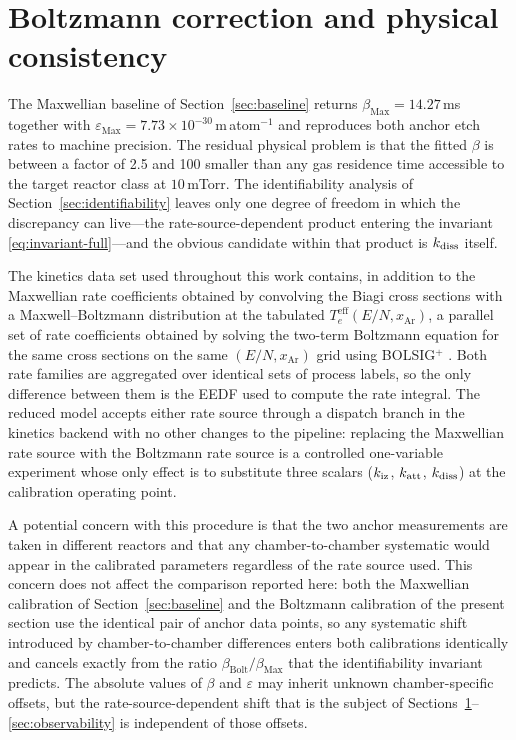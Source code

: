 \section{Boltzmann correction and physical consistency}
\label{sec:boltzmann}

The Maxwellian baseline of Section~\ref{sec:baseline} returns
$\beta_{\mathrm{Max}} = 14.27\,$ms together with
$\varepsilon_{\mathrm{Max}} = 7.73\times10^{-30}\,$m\,atom$^{-1}$
and reproduces both anchor etch rates to machine precision. The
residual physical problem is that the fitted $\beta$ is between a
factor of 2.5 and 100 smaller than any gas residence time accessible
to the target reactor class at $10\,$mTorr. The identifiability
analysis of Section~\ref{sec:identifiability} leaves only one degree
of freedom in which the discrepancy can live---the
rate-source-dependent product entering the invariant
\eqref{eq:invariant-full}---and the obvious candidate within that
product is $k_{\mathrm{diss}}$ itself.

The kinetics data set used throughout this work contains, in
addition to the Maxwellian rate coefficients obtained by convolving
the Biagi cross sections \citep{biagi} with a Maxwell--Boltzmann
distribution at the tabulated $T_e^{\mathrm{eff}}(E/N,x_{\mathrm{Ar}})$,
a parallel set of rate coefficients obtained by solving the two-term
Boltzmann equation for the same cross sections on the same
$(E/N,x_{\mathrm{Ar}})$ grid using BOLSIG$^+$ \citep{hagelaar2005}.
Both rate families are aggregated over identical sets of process
labels, so the only difference between them is the EEDF used to
compute the rate integral. The reduced model accepts either rate
source through a dispatch branch in the kinetics backend with no
other changes to the pipeline: replacing the Maxwellian rate source
with the Boltzmann rate source is a controlled one-variable
experiment whose only effect is to substitute three scalars
($k_{\mathrm{iz}}$, $k_{\mathrm{att}}$, $k_{\mathrm{diss}}$) at the calibration operating point.

A potential concern with this procedure is that the two anchor
measurements are taken in different reactors and that any
chamber-to-chamber systematic would appear in the calibrated
parameters regardless of the rate source used. This concern does
not affect the comparison reported here: both the Maxwellian
calibration of Section~\ref{sec:baseline} and the Boltzmann
calibration of the present section use the identical pair of anchor
data points, so any systematic shift introduced by chamber-to-chamber
differences enters both calibrations identically and cancels
exactly from the ratio
$\beta_{\mathrm{Bolt}}/\beta_{\mathrm{Max}}$ that the identifiability
invariant predicts. The absolute values of $\beta$ and
$\varepsilon$ may inherit unknown chamber-specific offsets, but the
rate-source-dependent shift that is the subject of
Sections~\ref{sec:boltzmann}--\ref{sec:observability} is independent
of those offsets.

